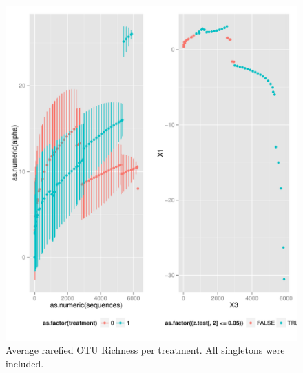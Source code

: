 \documentclass[a4paper, 11]{article}\usepackage[]{graphicx}\usepackage[]{color}
\makeatletter
\def\maxwidth{ %
  \ifdim\Gin@nat@width>\linewidth
    \linewidth
  \else
    \Gin@nat@width
  \fi
}
\newenvironment{knitrout}{}{} %
\makeatother
\begin{document}
\begin{knitrout}
\color{fgcolor}\begin{figure}[H]
\includegraphics[width=\maxwidth]{figure/rarefact_Orders1a-1} \caption[Average rarefied OTU Richness per treatment]{Average rarefied OTU Richness per treatment. All singletons were included.}\label{fig:rarefact_Orders1a}
\end{figure}


\end{knitrout}
%
%
%
\end{document}
